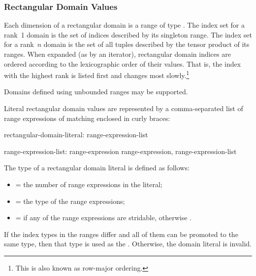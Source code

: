 \subsubsection{Rectangular Domain Values}
\label{Rectangular_Domain_Values}

Each dimension of a rectangular domain is a range of
type   .  The index set for a rank~1 domain is the set of indices
described by its singleton range.  The index set for a rank~$n$
domain is the set of all  tuples described by the
tensor product of its ranges.  When expanded (as by an iterator), rectangular domain indices are ordered
according to the lexicographic order of their values.  That is, the index with
the highest rank is listed first and changes most slowly.\footnote{This is also
known as row-major ordering.}



\begin{future}
Domains defined using unbounded ranges may be supported.
\end{future}


Literal rectangular domain values are represented by a comma-separated
list of range expressions of matching  enclosed in
curly braces:


\begin{syntax}
rectangular-domain-literal:
  { range-expression-list }

range-expression-list:
  range-expression
  range-expression, range-expression-list
\end{syntax}

\noindent The type of a rectangular domain literal is defined as follows:

\begin{itemize}
\item {} = the number of range expressions in the literal;
\item {} = the type of the range expressions;
\item {} =  if any of the range expressions
are stridable, otherwise .
\end{itemize}
\noindent If the index types in the ranges differ and all of them can be
promoted to the same type, then that type is used as the .
Otherwise, the domain literal is invalid.

